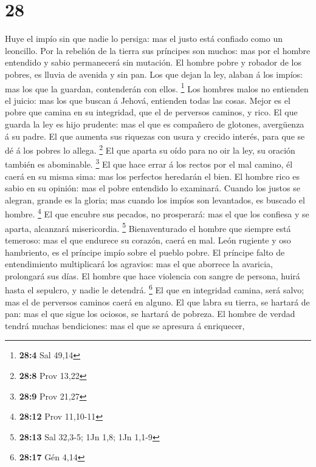 \hypertarget{section-27}{%
\section{28}\label{section-27}}

 Huye el impío sin que nadie lo persiga: mas el justo está
confiado como un leoncillo.  Por la rebelión de la tierra
sus príncipes son muchos: mas por el hombre entendido y sabio
permanecerá sin mutación.  El hombre pobre y robador de los
pobres, es lluvia de avenida y sin pan.  Los que dejan la
ley, alaban á los impíos: mas los que la guardan, contenderán con ellos.
\footnote{\textbf{28:4} Sal 49,14}  Los hombres malos no
entienden el juicio: mas los que buscan á Jehová, entienden todas las
cosas.  Mejor es el pobre que camina en su integridad, que
el de perversos caminos, y rico.  El que guarda la ley es
hijo prudente: mas el que es compañero de glotones, avergüenza á su
padre.  El que aumenta sus riquezas con usura y crecido
interés, para que se dé á los pobres lo allega. \footnote{\textbf{28:8}
  Prov 13,22}  El que aparta su oído para no oir la ley, su
oración también es abominable. \footnote{\textbf{28:9} Prov 21,27}
 El que hace errar á los rectos por el mal camino, él caerá
en su misma sima: mas los perfectos heredarán el bien.  El
hombre rico es sabio en su opinión: mas el pobre entendido lo examinará.
 Cuando los justos se alegran, grande es la gloria; mas
cuando los impíos son levantados, es buscado el hombre. \footnote{\textbf{28:12}
  Prov 11,10-11}  El que encubre sus pecados, no
prosperará: mas el que los confiesa y se aparta, alcanzará misericordia.
\footnote{\textbf{28:13} Sal 32,3-5; 1Jn 1,8; 1Jn 1,1-9} 
Bienaventurado el hombre que siempre está temeroso: mas el que endurece
su corazón, caerá en mal.  León rugiente y oso hambriento,
es el príncipe impío sobre el pueblo pobre.  El príncipe
falto de entendimiento multiplicará los agravios: mas el que aborrece la
avaricia, prolongará sus días.  El hombre que hace
violencia con sangre de persona, huirá hasta el sepulcro, y nadie le
detendrá. \footnote{\textbf{28:17} Gén 4,14}  El que en
integridad camina, será salvo; mas el de perversos caminos caerá en
alguno.  El que labra su tierra, se hartará de pan: mas el
que sigue los ociosos, se hartará de pobreza.  El hombre de
verdad tendrá muchas bendiciones: mas el que se apresura á enriquecer,
